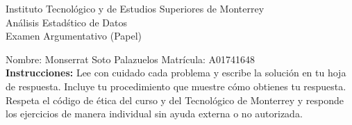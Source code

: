 \documentclass[10pt]{report}
\begin{document}
\newpage



\begin{center}
{\large Instituto Tecnol\'{o}gico y de Estudios Superiores de Monterrey \\
An\'alisis Estad\'stico de Datos } \\
Examen Argumentativo (Papel)
\end{center}

Nombre: \underline{\hspace*{.2in}}
Monserrat Soto Palazuelos
\underline{\hspace*{.2in}} \quad Matr\'icula:\underline{\hspace*{.2in}}
A01741648
\underline{\hspace*{.2in}} \\

{\bf Instrucciones:} Lee con cuidado cada problema y escribe la soluci\'on
en tu hoja de respuesta. Incluye tu procedimiento que muestre c\'omo obtienes tu respuesta.  Respeta el c\'odigo de \'etica del curso y del Tecnol\'ogico de Monterrey y responde los ejercicios de manera individual sin ayuda externa o no autorizada.
\end{document}
